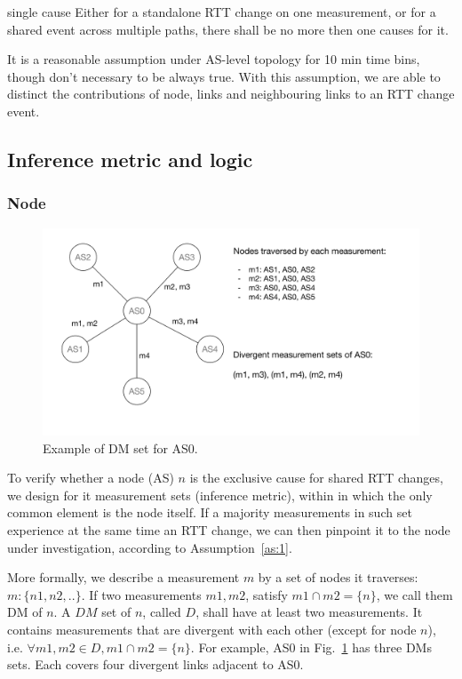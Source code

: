 \begin{assumption}{2}{single cause}\label{as:2}
Either for a standalone RTT change on one measurement, or for a shared event across multiple paths, there shall be no more then one causes for it.
\end{assumption}
It is a reasonable assumption under AS-level topology for 10 min time bins, though don't necessary to be always true. With this assumption, we are able to distinct the contributions of node, links and neighbouring links to an RTT change event.

\subsection{Inference metric and logic}
\subsubsection{Node}
\begin{figure}[!htb]
\centering
\includegraphics[width=1\textwidth]{gfx/chap5/dms.pdf}
\caption{Example of \acf{DM} set for AS0.}
\label{fig:chap5_dms}
\end{figure}

To verify whether a node (AS) $n$ is the exclusive cause for shared RTT changes, we
design for it measurement sets (inference metric), within in which the only common element is the node itself. If a majority measurements in such set experience at the same time an RTT change, we can then pinpoint it to the node under investigation, according to Assumption~\ref{as:1}.

More formally, we describe a measurement $m$ by a set of nodes it traverses: $m:\{n1, n2,..\}$. 
If two measurements $m1, m2$, satisfy $m1 \cap m2 = \{n\}$, we call them \acf{DM} of $n$.
A $DM$ set of $n$, called $D$, shall have at least two measurements. It contains measurements that are divergent with each other (except for node $n$), i.e. $\forall m1, m2 \in D, m1 \cap m2 = \{n\}$.
For example, AS0 in Fig.~\ref{fig:chap5_dms} has three \acp{DM} sets. Each covers four divergent links adjacent to AS0.

